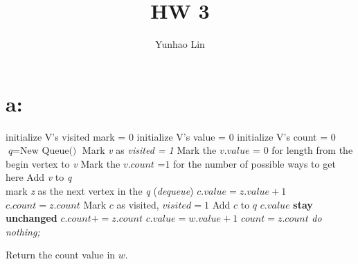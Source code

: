 \documentclass[]{article}
\title{HW 3}
\author{Yunhao Lin}
\begin{document}
\maketitle

\section{a:}

\begin{algorithm}[H]
   \begin{algorithmic}[1]

        \State initialize V's visited mark = 0
        \State initialize V's value = 0
        \State initialize V's count = 0
    \EndFor
    \\
    \State $\textit{q} = \text{New Queue()}$
    \State Mark \textit{v} as \textit{visited = 1}
    \State Mark the $\textit{v.value = 0}$ for length from the begin vertex to \textit{v}
    \State Mark the $\textit{v.count =1}$ for the number of possible ways to get here
    \State Add \textit{v} to \textit{q}
    \\
        \State mark \textit{z} as the next vertex in the \textit{q} (\textit{dequeue})
                \State $c.value = z.value +1$
                \State $c.count = z.count$
                \State Mark $c$ as visited, $visited =1$
                \State Add $c$ to $q$
            \Else
                    \State $c.value$ \textbf{ stay unchanged}
                    \State $c.count += z.count$ 
                    \State $c.value = w.value +1$
                    \State $count = z.count$
                    \State \textit{do nothing;}
                \EndIf
            \EndIf
            
        \EndFor
    \EndWhile
    \State Return the count value in $w$.
    \EndProcedure
    \end{algorithmic}
\end{algorithm}
\end{document}

